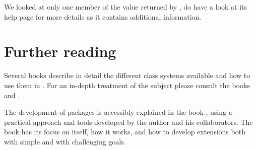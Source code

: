 \documentclass[krantz2]{krantz}\usepackage{knitr}
\begin{document}
\begin{warningbox}
\begin{knitrout}\footnotesize
{}\color{fgcolor}\begin{kframe}
\begin{alltt}
\hlopt{::} \hlkwb{<-} 
\hlopt{::}
\end{alltt}
\end{kframe}
\end{knitrout}

We looked at only one member of the value returned by , do have a look at its help page for more details as it contains additional information.

\end{warningbox}

\section{Further reading}

Several books describe in detail the different class systems available and how to use them in \Rlang. For an in-depth treatment of the subject please consult the books  \autocite{Wickham2019} and  \autocite{Chambers2016}.

The development of \Rlang packages is accessibly explained in the book  \autocite{Wickham2023}, using a practical approach and tools developed by the author and his collaborators. The book  \autocite{Chambers2016} has its focus on \Rlang itself, how it works, and how to develop extensions both with simple and with challenging goals.












\backmatter

\printbibliography

\printindex\label{idx:general}

\printindex[rindex]\label{idx:rindex}

\printindex[rcatsidx]\label{idx:rcats}

\printindex[faqindex]\label{idx:faqindex}
\end{document}

